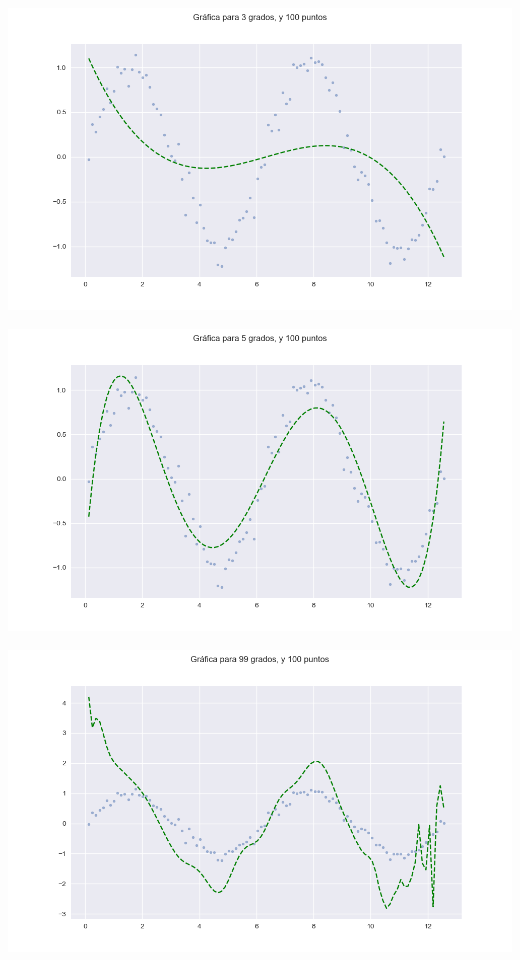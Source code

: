 \documentclass{article}
\begin{document}
\begin{enumerate}
\begin{itemize}
\begin{center}
            \includegraphics[width=\textwidth]{Ajuste3100.png}
       
            \includegraphics[width=\textwidth]{Ajuste5100.png}
        
            \includegraphics[width=\textwidth]{Ajuste99100.png}
      

\end{center}
\end{itemize}
\end{enumerate}
\end{document}
